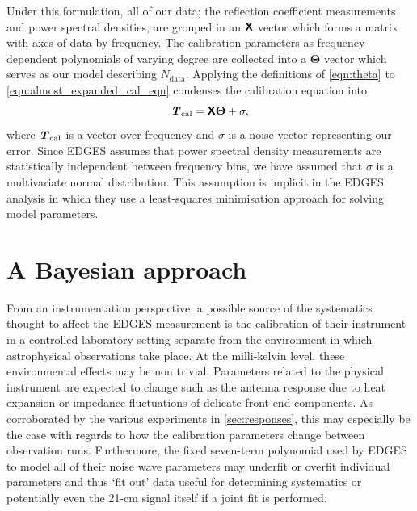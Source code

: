 Under this formulation, all of our data; the reflection coefficient measurements and power spectral densities, are grouped in an $\textbf{\textsf{X}}$ vector which forms a matrix with axes of data by frequency. The calibration parameters as frequency-dependent polynomials of varying degree are collected into a $\boldsymbol{\Theta}$ vector which serves as our model describing $N_{\mathrm{data}}$. Applying the definitions of \cref{eqn:theta} to \cref{eqn:almost_expanded_cal_eqn} condenses the calibration equation into
\begin{equation}\label{eqn:linearmodel}
    \textbf{\textit{T}}_{\mathrm{cal}} = \textbf{\textsf{X}}\boldsymbol{\Theta}+\sigma,
\end{equation}
where $\textbf{\textit{T}}_{\mathrm{cal}}$ is a vector over frequency and $\sigma$ is a noise vector representing our error. Since EDGES assumes that power spectral density measurements are statistically independent between frequency bins, we have assumed that $\sigma$ is a multivariate normal distribution. This assumption is implicit in the EDGES analysis in which they use a least-squares minimisation approach for solving model parameters.


\section{A Bayesian approach}\label{sec:bayes}
From an instrumentation perspective, a possible source of the systematics thought to affect the EDGES measurement is the calibration of their instrument in a controlled laboratory setting separate from the environment in which astrophysical observations take place. At the milli-kelvin level, these environmental effects may be non trivial. Parameters related to the physical instrument are expected to change such as the antenna response due to heat expansion or impedance fluctuations of delicate front-end components. As corroborated by the various experiments in \cref{sec:responses}, this may especially be the case with regards to how the calibration parameters change between observation runs. Furthermore, the fixed seven-term polynomial used by EDGES to model all of their noise wave parameters may underfit or overfit individual parameters and thus `fit out' data useful for determining systematics or potentially even the 21-cm signal itself if a joint fit is performed.

